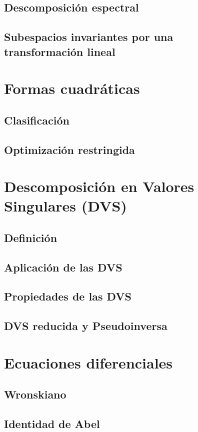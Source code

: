 \documentclass[oneside]{article}
\numberwithin{equation}{section}
\numberwithin{figure}{section}
\numberwithin{table}{section}
\begin{document}
				\subsection{Descomposición espectral}
				\subsection{Subespacios invariantes por una transformación lineal}
			\section{Formas cuadráticas}
				\subsection{Clasificación}
				\subsection{Optimización restringida}
			\section{Descomposición en Valores Singulares (DVS)}
				\subsection{Definición}
				\subsection{Aplicación de las DVS}
				\subsection{Propiedades de las DVS}
				\subsection{DVS reducida y Pseudoinversa}
			\section{Ecuaciones diferenciales}
				\subsection{Wronskiano}
				\subsection{Identidad de Abel}
\end{document}
